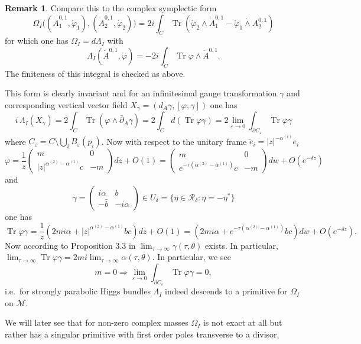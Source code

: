 \documentclass[12pt,letterpaper,reqno]{amsart}
\theoremstyle{remark}
\theoremstyle{definition}
\newtheorem{rem}[thm]{Remark}
\numberwithin{thm}{section}
\numberwithin{equation}{section}
\numberwithin{figure}{section}
\DeclareMathOperator{\Tr}{Tr}
\begin{document}
\begin{rem}
Compare this to the complex symplectic form
\[
\Omega_I \bigl( (\dot A_1^{0,1}, \dot \varphi_1), (\dot A_2^{0,1}, \dot \varphi_2) \bigr) = 2i \int_C \Tr (\dot \varphi_2 \wedge \dot A_1^{0,1} - \dot \varphi_1\dot \wedge A_2^{0,1})
\]
for which one has $\Omega_I =  d \Lambda_I$ with
\[
\Lambda_I(\dot A^{0,1}, \dot \varphi) = -2i \int_C \Tr \varphi \wedge\dot A^{0,1}.
\]
The finiteness of this integral is checked as above.

This form is clearly invariant and for an infinitesimal gauge transformation $\gamma$ and corresponding vertical vector field $X_\gamma=(d_A \gamma, [\varphi,\gamma])$ one has
\[
i \,\Lambda_I(X_\gamma) =  2\int_C \Tr (\varphi \wedge \bar\partial_A \gamma) = 2\int_C d  (\Tr \varphi\gamma  ) =  2\lim_{\varepsilon \to 0}\int_{\partial C_\varepsilon} \Tr \varphi \gamma
\]
where $C_\varepsilon = C \setminus \bigcup_i B_\varepsilon(p_i)$. Now with respect to the unitary frame $\tilde e_i = |z|^{-\alpha^{(i)}}e_i$
\[
\varphi =\frac{1}{z} \begin{pmatrix}
 m & 0 \\ |z|^{\alpha^{(2)} - \alpha^{(1)}} c & -m	
 \end{pmatrix}
dz + O(1) = \begin{pmatrix}
 m & 0 \\ e^{-\tau(\alpha^{(2)} - \alpha^{(1)})} c & -m 	
 \end{pmatrix}
dw + O(e^{-\delta z})
\]
and 
\[
\gamma = \begin{pmatrix}
 	i \alpha & b \\ - \bar b & - i \alpha
 \end{pmatrix} \in U_\delta = \{ \eta \in \mathcal{R}_\delta : \eta = - \eta^* \}
\]
one has
\[
\Tr \varphi \gamma = \frac{1}{z} ( 2 mi\alpha + |z|^{\alpha^{(2)} -\alpha^{(1)}} bc) dz + O(1) = (2m i \alpha + e^{-\tau (\alpha^{(2)} -\alpha^{(1)})} bc ) dw +  O(e^{-\delta z}).
\]
Now according to Proposition 3.3 in \cite{collier2024conformallimitsparabolicslnchiggs} $\lim_{\tau \to \infty} \gamma (\tau, \theta)$ exists. In particular, $\lim_{\tau \to \infty} \Tr \varphi \gamma = 2 m i \lim_{\tau \to \infty} \alpha(\tau, \theta)$. In particular, we see
\[
m = 0 \Longrightarrow \lim_{\varepsilon \to 0}\int_{\partial C_\varepsilon} \Tr \varphi \gamma = 0,
\]
i.e.\ for strongly parabolic Higgs bundles $\Lambda_I$ indeed descends to a primitive for $\Omega_I$ on $\mathcal{M}$. 

We will later see that for non-zero complex masses $\Omega_I$ is not exact at all but rather has a singular primitive with first order poles transverse to a divisor.
\end{rem}
\end{document}
